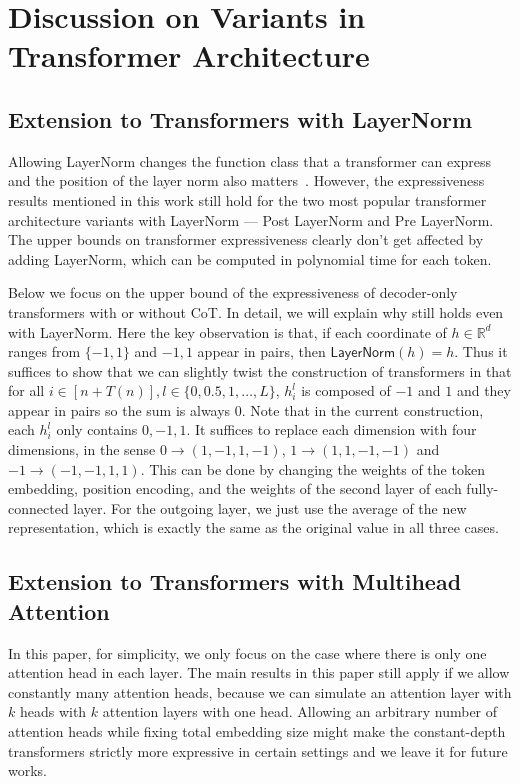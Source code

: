 
\section{Discussion on Variants in Transformer Architecture}\label{appsec:discussion}

\subsection{Extension to Transformers with LayerNorm}\label{appsec:layernorm}

Allowing LayerNorm changes the function class that a transformer can express and the position of the layer norm also matters~\citep{xiong2020layer}. However, the expressiveness results mentioned in this work still hold for the two most popular transformer architecture variants with LayerNorm --- Post LayerNorm and Pre LayerNorm. The upper bounds on transformer expressiveness  clearly don't get affected by adding LayerNorm, which can be computed in polynomial time for each token. 

Below we focus on the upper bound of the expressiveness of decoder-only transformers with or without CoT. In detail, we will explain why  still holds even with LayerNorm. Here the key observation is that, if each coordinate of $h\in\mathbb{R}^d$ ranges from $\{-1,1\}$ and $-1,1$ appear in pairs, then $\textsf{LayerNorm}(h) = h$. Thus it suffices to show that we can slightly twist the construction of transformers in  that for all $i\in[n+T(n)], l\in\{0,0.5,1,\ldots,L\}$, $h^l_i$ is composed of $-1$ and $1$ and they appear in pairs so the sum is always $0$. Note that in the current construction, each $h^l_i$ only contains $0,-1,1$. It suffices to replace each dimension with four dimensions, in the sense $0\to (1,-1,1,-1)$, $1\to (1,1,-1,-1)$ and $-1\to (-1,-1,1,1)$. This can be done by changing the weights of the token embedding, position encoding, and the weights of the second layer of each fully-connected layer. For the outgoing layer, we just use the average of the new representation, which is exactly the same as the original value in all three cases. 

 \subsection{Extension to Transformers with Multihead Attention}\label{appsec:multihead}
 
 In this paper, for simplicity, we only focus on the case where there is only one attention head in each layer. The main results in this paper still apply if we allow constantly many attention heads, because we can simulate an attention layer with $k$ heads with $k$ attention layers with one head. Allowing an arbitrary number of attention heads while fixing total embedding size might make the constant-depth transformers strictly more expressive in certain settings and we leave it for future works.

